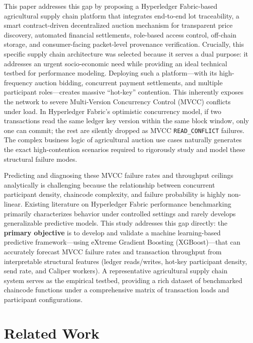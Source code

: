 \documentclass[12pt]{article}
\begin{document}
	This paper addresses this gap by proposing a Hyperledger Fabric-based agricultural supply chain platform that integrates end-to-end lot traceability, a smart contract-driven decentralized auction mechanism for transparent price discovery, automated financial settlements, role-based access control, off-chain storage, and consumer-facing packet-level provenance verification. Crucially, this specific supply chain architecture was selected because it serves a dual purpose: it addresses an urgent socio-economic need while providing an ideal technical testbed for performance modeling. Deploying such a platform---with its high-frequency auction bidding, concurrent payment settlements, and multiple participant roles---creates massive ``hot-key'' contention. This inherently exposes the network to severe Multi-Version Concurrency Control (MVCC) conflicts under load. In Hyperledger Fabric's optimistic concurrency model, if two transactions read the same ledger key version within the same block window, only one can commit; the rest are silently dropped as MVCC \texttt{READ\_CONFLICT} failures. The complex business logic of agricultural auction use cases naturally generates the exact high-contention scenarios required to rigorously study and model these structural failure modes.

	Predicting and diagnosing these MVCC failure rates and throughput ceilings analytically is challenging because the relationship between concurrent participant density, chaincode complexity, and failure probability is highly non-linear. Existing literature on Hyperledger Fabric performance benchmarking primarily characterizes behavior under controlled settings and rarely develops generalizable predictive models. This study addresses this gap directly: the \textbf{primary objective} is to develop and validate a machine learning-based predictive framework---using eXtreme Gradient Boosting (XGBoost)---that can accurately forecast MVCC failure rates and transaction throughput from interpretable structural features (ledger reads/writes, hot-key participant density, send rate, and Caliper workers). A representative agricultural supply chain system serves as the empirical testbed, providing a rich dataset of benchmarked chaincode functions under a comprehensive matrix of transaction loads and participant configurations.
	
	
\section{Related Work}
\end{document}
